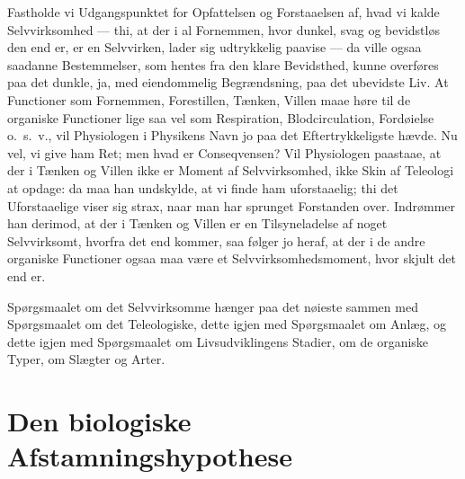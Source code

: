 \documentclass[12pt]{book}
\newcommand{\apage}[1]{\marginnote{\footnotesize\textit{[#1]}}}
\begin{document}
Fastholde vi Udgangspunktet for Opfattelsen og Forstaaelsen af, hvad vi
kalde Selvvirksomhed --- thi, at der i al Fornemmen, hvor dunkel, svag og
bevidstløs den end er, er en Selvvirken, lader sig udtrykkelig paavise ---
da ville ogsaa saadanne Bestemmelser, som hentes fra den klare Bevidsthed,
kunne overføres paa det dunkle, ja, med eiendommelig Begrændsning, paa det
ubevidste Liv. At Functioner som Fornemmen, Forestillen, Tænken, Villen
maae høre til de organiske Functioner lige saa vel som Respiration,
Blodcirculation, Fordøielse o.\ s.\ v., vil Physiologen i Physikens Navn jo paa
det Eftertrykkeligste hævde. Nu vel, vi give ham Ret; men hvad er
Conseqvensen? Vil Physiologen paastaae, at der i Tænken og Villen ikke er
Moment af Selvvirksomhed, ikke Skin af Teleologi at opdage: da maa han
undskylde, at vi finde ham uforstaaelig; thi det Uforstaaelige viser sig
strax, naar man har sprunget Forstanden over. Indrømmer han derimod, at der
i Tænken og Villen er en Tilsyneladelse af noget Selvvirksomt, hvorfra det
end kommer, \apage{195} saa følger jo heraf, at der i de andre organiske Functioner
ogsaa maa være et Selvvirksomhedsmoment, hvor skjult det end er.

Spørgsmaalet om det Selvvirksomme hænger paa det nøieste sammen med
Spørgsmaalet om det Teleologiske, dette igjen med Spørgsmaalet om Anlæg, og
dette igjen med Spørgsmaalet om Livsudviklingens Stadier, om de organiske
Typer, om Slægter og Arter.

\section{Den biologiske Afstamningshypothese}
\label{sec:19}
\end{document}
